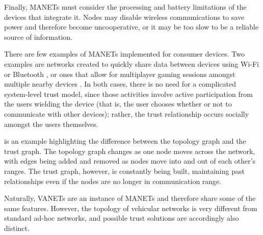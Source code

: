 Finally, MANETs must consider the processing and battery limitations of the devices that integrate it.
Nodes may disable wireless communications to save power and therefore become uncooperative, or it may be too slow to be a reliable source of information.

There are few examples of MANETs implemented for consumer devices.
Two examples are networks created to quickly share data between devices using Wi-Fi or Bluetooth \citep{krochmal2014discovery}, or ones that allow for multiplayer gaming sessions amongst multiple nearby devices \citep{sasaki2011wireless}.
In both cases, there is no need for a complicated system-level trust model, since those activities involve active participation from the users wielding the device (that is, the user chooses whether or not to communicate with other devices); rather, the trust relationship occurs socially amongst the users themselves.

 is an example highlighting the difference between the topology graph and the trust graph.
The topology graph changes as one node moves across the network, with edges being added and removed as nodes move into and out of each other's ranges.
The trust graph, however, is constantly being built, maintaining past relationships even if the nodes are no longer in communication range.

Naturally, VANETs are an instance of MANETs and therefore share some of the same features.
However, the topology of vehicular networks is very different from standard ad-hoc networks, and possible trust solutions are accordingly also distinct.

